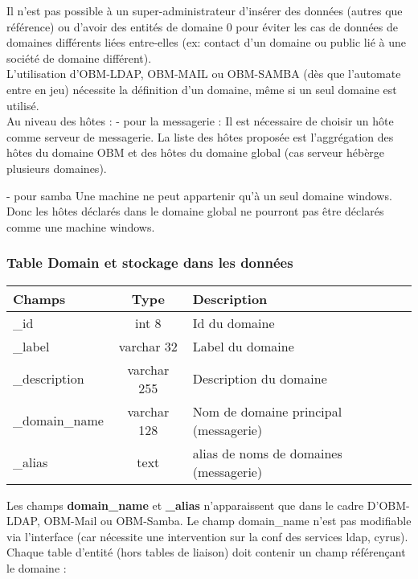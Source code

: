 Il n'est pas possible à un super-administrateur d'insérer des données (autres que référence) ou d'avoir des entités de domaine 0 pour éviter les cas de données de domaines différents liées entre-elles (ex: contact d'un domaine ou public lié à une société de domaine différent).\\

L'utilisation d'OBM-LDAP, OBM-MAIL ou OBM-SAMBA (dès que l'automate entre en jeu) nécessite la définition d'un domaine, même si un seul domaine est utilisé.\\

Au niveau des hôtes :
- pour la messagerie :
Il est nécessaire de choisir un hôte comme serveur de messagerie.
La liste des hôtes proposée est l'aggrégation des hôtes du domaine OBM et des hôtes du domaine global (cas serveur hébèrge plusieurs domaines).

- pour samba
Une machine ne peut appartenir qu'à un seul domaine windows.
Donc les hôtes déclarés dans le domaine global ne pourront pas être déclarés comme une machine windows.


\subsubsection{Table Domain et stockage dans les données}


\begin{tabular}{|p{3cm}|c|p{8cm}|}
\hline
\textbf{Champs} & \textbf{Type} & \textbf{Description} \\
\hline
\_id & int 8 & Id du domaine \\
\hline
\_label & varchar 32 & Label du domaine \\
\hline
\_description & varchar 255 & Description du domaine \\
\hline
\_domain\_name & varchar 128 & Nom de domaine principal (messagerie) \\
\hline
\_alias & text & alias de noms de domaines (messagerie) \\
\hline
\end{tabular}
\vspace{0.3cm}

Les champs \textbf{domain\_name} et \textbf{\_alias} n'apparaissent que dans le cadre D'OBM-LDAP, OBM-Mail ou OBM-Samba.
Le champ domain\_name n'est pas modifiable via l'interface (car nécessite une intervention sur la conf des services ldap, cyrus).\\



Chaque table d'entité (hors tables de liaison) doit contenir un champ référençant le domaine :\\

